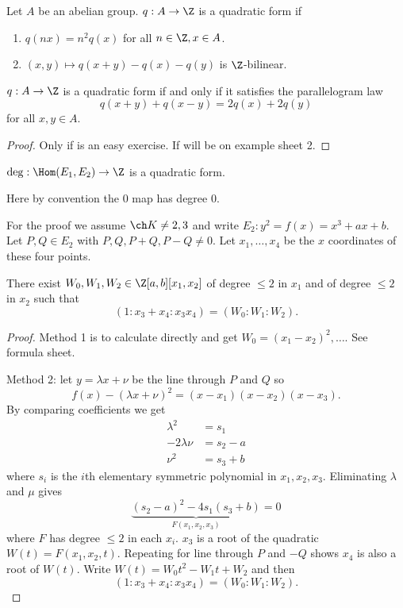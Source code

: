 \documentclass[a4paper]{article}
\theoremstyle{definition}
\theoremstyle{theorem}
\begin{document}
\begin{definition}
  Let \(A\) be an abelian group. \(q: A \to \Z\) is a quadratic form if
  \begin{enumerate}
  \item \(q(nx) = n^2 q(x)\) for all \(n \in \Z, x \in A\).
  \item \((x, y) \mapsto q(x + y) - q(x) - q(y)\) is \(\Z\)-bilinear.
  \end{enumerate}
\end{definition}

\begin{lemma}
  \(q: A \to \Z\) is a quadratic form if and only if it satisfies the parallelogram law
  \[
    q(x + y) + q(x - y) = 2q(x) + 2q(y)
  \]
  for all \(x, y \in A\).
\end{lemma}

\begin{proof}
  Only if is an easy exercise. If will be on example sheet 2.
\end{proof}

\begin{theorem}
  \(\deg: \Hom(E_1, E_2) \to \Z\) is a quadratic form.
\end{theorem}
Here by convention the 0 map has degree \(0\).

For the proof we assume \(\ch K \neq 2, 3\) and write \(E_2: y^2 = f(x) = x^3 + ax + b\). Let \(P, Q \in E_2\) with \(P, Q, P + Q, P - Q \neq 0\). Let \(x_1, \dots, x_4\) be the \(x\) coordinates of these four points.

\begin{lemma}
  There exist \(W_0, W_1, W_2 \in \Z[a, b][x_1, x_2]\) of degree \(\leq 2\) in \(x_1\) and of degree \(\leq 2\) in \(x_2\) such that
  \[
    (1: x_3 + x_4: x_3x_4) = (W_0: W_1: W_2).
  \]
\end{lemma}

\begin{proof}
  Method 1 is to calculate directly and get \(W_0 = (x_1 - x_2)^2, \dots\). See formula sheet.

  Method 2: let \(y = \lambda x + \nu\) be the line through \(P\) and \(Q\) so
  \[
    f(x) - (\lambda x + \nu)^2 = (x - x_1)(x - x_2)(x - x_3).
  \]
  By comparing coefficients we get
  \begin{align*}
    \lambda^2 &= s_1 \\
    -2 \lambda \nu &= s_2 - a \\
    \nu^2 &= s_3 + b
  \end{align*}
  where \(s_i\) is the \(i\)th elementary symmetric polynomial in \(x_1, x_2, x_3\). Eliminating \(\lambda\) and \(\mu\) gives
  \[
    \underbrace{(s_2 - a)^2 - 4s_1 (s_3 + b)}_{F(x_1, x_2, x_3)} = 0
  \]
  where \(F\) has degree \(\leq 2\) in each \(x_i\). \(x_3\) is a root of the quadratic \(W(t) = F(x_1, x_2, t)\). Repeating for line through \(P\) and \(-Q\) shows \(x_4\) is also a root of \(W(t)\). Write \(W(t) = W_0t^2 - W_1t + W_2\) and then
  \[
    (1: x_3 + x_4: x_3x_4) = (W_0: W_1: W_2).
  \]
\end{proof}
\end{document}
